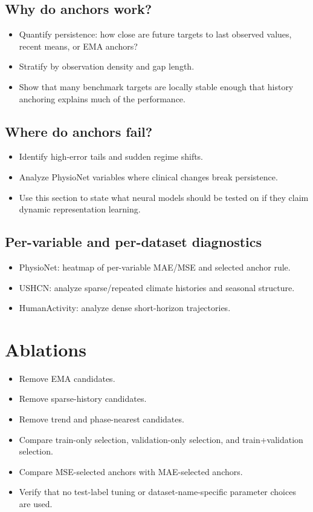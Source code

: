 \documentclass{article}
\begin{document}
\subsection{Why do anchors work?}

\begin{itemize}
    \item Quantify persistence: how close are future targets to last observed
    values, recent means, or EMA anchors?
    \item Stratify by observation density and gap length.
    \item Show that many benchmark targets are locally stable enough that
    history anchoring explains much of the performance.
\end{itemize}

\subsection{Where do anchors fail?}

\begin{itemize}
    \item Identify high-error tails and sudden regime shifts.
    \item Analyze PhysioNet variables where clinical changes break persistence.
    \item Use this section to state what neural models should be tested on if
    they claim dynamic representation learning.
\end{itemize}

\subsection{Per-variable and per-dataset diagnostics}

\begin{itemize}
    \item PhysioNet: heatmap of per-variable MAE/MSE and selected anchor rule.
    \item USHCN: analyze sparse/repeated climate histories and seasonal
    structure.
    \item HumanActivity: analyze dense short-horizon trajectories.
\end{itemize}

\section{Ablations}

\begin{itemize}
    \item Remove EMA candidates.
    \item Remove sparse-history candidates.
    \item Remove trend and phase-nearest candidates.
    \item Compare train-only selection, validation-only selection, and
    train+validation selection.
    \item Compare MSE-selected anchors with MAE-selected anchors.
    \item Verify that no test-label tuning or dataset-name-specific parameter
    choices are used.
\end{itemize}
\end{document}
